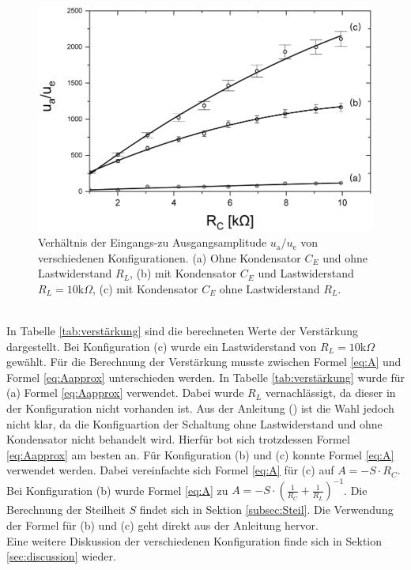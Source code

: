 \documentclass[a4paper,usenatbib]{aspdoc}
\begin{document}
            \begin{figure}
                \centering
                \includegraphics[width=140mm]{graphs/Verstrkung1.png}
                \caption{Verhältnis der Eingangs-zu Ausgangsamplitude $u_{\mathrm{a}} / u_{\mathrm{e}}$ von verschiedenen Konfigurationen. (a) Ohne Kondensator $C_E$ und ohne Lastwiderstand $R_L$, (b) mit Kondensator $C_E$ und Lastwiderstand $R_L=10$k$\Omega$, (c) mit Kondensator $C_E$ ohne Lastwiderstand $R_L$.}
                \label{fig:verstärkung}
            \end{figure} \\
            \noindent In Tabelle \ref{tab:verstärkung} sind die berechneten Werte der Verstärkung dargestellt. Bei Konfiguration (c) wurde ein Lastwiderstand von $R_L=10$k$\Omega$ gewählt. Für die Berechnung der Verstärkung musste zwischen Formel \ref{eq:A} und Formel \ref{eq:Aapprox} unterschieden werden. In Tabelle \ref{tab:verstärkung} wurde für (a) Formel \ref{eq:Aapprox} verwendet. Dabei wurde $R_L$ vernachlässigt, da dieser in der Konfiguration nicht vorhanden ist. Aus der Anleitung (\cite{anleitung}) ist die Wahl jedoch nicht klar, da die Konfiguartion der Schaltung ohne Lastwiderstand und ohne Kondensator nicht behandelt wird. Hierfür bot sich trotzdessen Formel \ref{eq:Aapprox} am besten an. Für Konfiguration (b) und (c) konnte Formel \ref{eq:A} verwendet werden. Dabei vereinfachte sich Formel \ref{eq:A} für (c) auf $A= -S \cdot R_C$. Bei Konfiguration (b) wurde Formel \ref{eq:A} zu $A=-S \cdot(\frac{1}{R_C} + \frac{1}{R_L})^{-1}$. Die Berechnung der Steilheit $S$ findet sich in Sektion \ref{subsec:Steil}.
            Die Verwendung der Formel für (b) und (c) geht direkt aus der Anleitung hervor. \\
            Eine weitere Diskussion der verschiedenen Konfiguration finde sich in Sektion \ref{sec:discussion} wieder.
        
\end{document}
